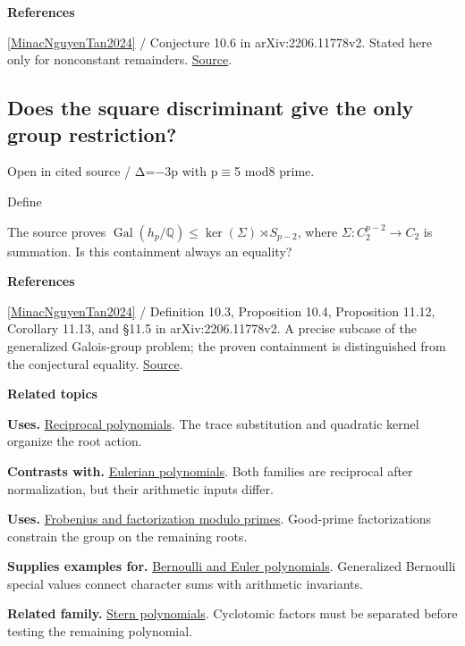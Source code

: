 \documentclass[11pt,a4paper,oneside,openany]{book}
\newcommand{\atlasdisplay}[1]{\par\begingroup\centering\vspace{3pt}\noindent\adjustbox{max width=\linewidth}{\(\displaystyle #1\)}\par\vspace{5pt}\endgroup}
\newenvironment{sources}{\par\smallskip\begingroup\footnotesize\color{atlasgray}\leftskip=10pt\setlength{\parskip}{2pt}}{\par\endgroup\smallskip}
\begin{document}
\begin{sources}
\textbf{References}\par\smallskip
\noindent\hyperlink{ref:MinacNguyenTan2024}{[MinacNguyenTan2024]} / Conjecture 10.6 in arXiv:2206.11778v2. Stated here only for nonconstant remainders. \href{https://arxiv.org/abs/2206.11778}{Source}.\par
\end{sources}\color{black}
\subsection*{Does the square discriminant give the only group restriction?}
{\small\sffamily\color{atlasgold}Open in cited source / Δ=\ensuremath{-}3p with p\ensuremath{\equiv}5 mod8 prime.}\par\smallskip
\color{black} Define\par

\atlasdisplay{h_p=-\frac{F_{-3p}}{x\Phi_1\Phi_3\Phi_p},\qquad \deg h_p=2(p-2).}
\color{black} The source proves \(\operatorname{Gal}(h_p/\mathbb Q)\le\ker(\Sigma)\rtimes S_{p-2}\), where \(\Sigma:C_2^{p-2}\to C_2\) is summation. Is this containment always an equality?\par
\begin{sources}
\textbf{References}\par\smallskip
\noindent\hyperlink{ref:MinacNguyenTan2024}{[MinacNguyenTan2024]} / Definition 10.3, Proposition 10.4, Proposition 11.12, Corollary 11.13, and §11.5 in arXiv:2206.11778v2. A precise subcase of the generalized Galois-group problem; the proven containment is distinguished from the conjectural equality. \href{https://arxiv.org/abs/2206.11778}{Source}.\par
\end{sources}\color{black}
\par\medskip\begingroup\footnotesize\setlength{\parskip}{1pt}\textbf{\sffamily\color{atlasgreen}Related topics}\par
\color{black}\textbf{Uses.} \hyperlink{article:reciprocity}{Reciprocal polynomials}. The trace substitution and quadratic kernel organize the root action.\par
\color{black}\textbf{Contrasts with.} \hyperlink{article:eulerian}{Eulerian polynomials}. Both families are reciprocal after normalization, but their arithmetic inputs differ.\par
\color{black}\textbf{Uses.} \hyperlink{article:frobenius}{Frobenius and factorization modulo primes}. Good-prime factorizations constrain the group on the remaining roots.\par
\color{black}\textbf{Supplies examples for.} \hyperlink{article:bernoulli-euler}{Bernoulli and Euler polynomials}. Generalized Bernoulli special values connect character sums with arithmetic invariants.\par
\color{black}\textbf{Related family.} \hyperlink{article:stern-polynomials}{Stern polynomials}. Cyclotomic factors must be separated before testing the remaining polynomial.\par
\endgroup
\end{document}
